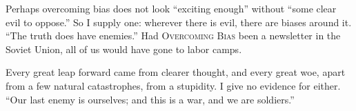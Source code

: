 Perhaps overcoming bias does not look ``exciting enough'' without ``some clear evil to oppose.'' So I supply one: wherever there is evil, there are biases around it. ``The truth does have enemies.'' Had \textsc{Overcoming Bias} been a newsletter in the Soviet Union, all of us would have gone to labor camps.

Every great leap forward came from clearer thought, and every great woe, apart from a few natural catastrophes, from a stupidity. I give no evidence for either. ``Our last enemy is ourselves; and this is a war, and we are soldiers.'' 
